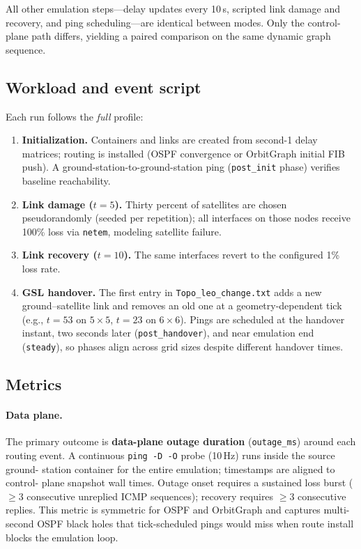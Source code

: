 All other emulation steps---delay updates every 10\,s, scripted link damage and
recovery, and ping scheduling---are identical between modes.
Only the control-plane path differs, yielding a paired comparison on the same
dynamic graph sequence.

\subsection{Workload and event script}

Each run follows the \emph{full} profile:

\begin{enumerate}
  \item \textbf{Initialization.} Containers and links are created from second-1
        delay matrices; routing is installed (OSPF convergence or OrbitGraph
        initial FIB push). A ground-station-to-ground-station ping
        (\texttt{post\_init} phase) verifies baseline reachability.
  \item \textbf{Link damage ($t{=}5$).} Thirty percent of satellites are chosen
        pseudorandomly (seeded per repetition); all interfaces on those nodes
        receive 100\% loss via \texttt{netem}, modeling satellite failure.
  \item \textbf{Link recovery ($t{=}10$).} The same interfaces revert to the
        configured 1\% loss rate.
  \item \textbf{GSL handover.} The first entry in \texttt{Topo\_leo\_change.txt}
        adds a new ground--satellite link and removes an old one at a
        geometry-dependent tick (e.g., $t{=}53$ on $5{\times}5$, $t{=}23$ on
        $6{\times}6$). Pings are scheduled at the handover instant, two seconds
        later (\texttt{post\_handover}), and near emulation end
        (\texttt{steady}), so phases align across grid sizes despite different
        handover times.
\end{enumerate}

\subsection{Metrics}

\paragraph{Data plane.}
The primary outcome is \textbf{data-plane outage duration} (\texttt{outage\_ms})
around each routing event.
A continuous \texttt{ping -D -O} probe (10\,Hz) runs inside the source ground-
station container for the entire emulation; timestamps are aligned to control-
plane snapshot wall times.
Outage onset requires a sustained loss burst ($\geq$3 consecutive unreplied
ICMP sequences); recovery requires $\geq$3 consecutive replies.
This metric is symmetric for OSPF and OrbitGraph and captures multi-second OSPF
black holes that tick-scheduled pings would miss when route install blocks the
emulation loop.

